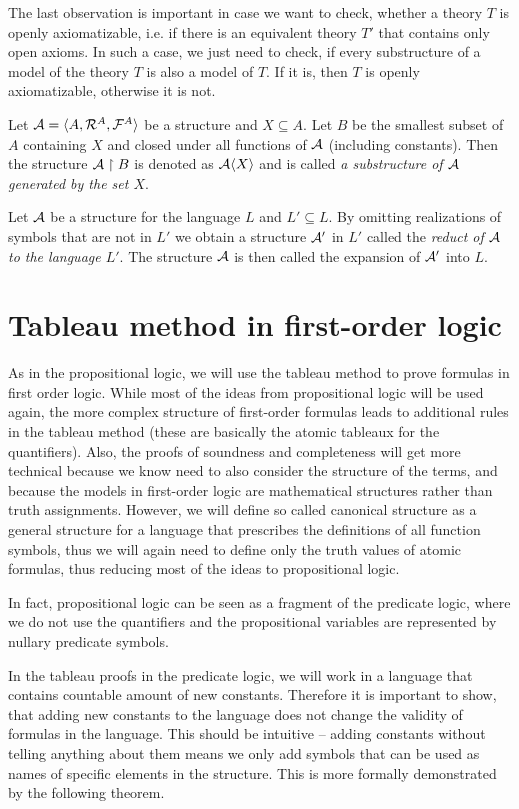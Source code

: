 The last observation is important in case we want to check, whether a theory $T$ is openly axiomatizable, i.e. if there is an equivalent theory $T'$ that contains only open axioms. In such a case, we just need to check, if every substructure of a model of the theory $T$ is also a model of $T$. If it is, then $T$ is openly axiomatizable, otherwise it is not.

Let $\mathcal{A} = \langle A, \mathcal{R}^A, \mathcal{F}^A \rangle$ be a structure and $X \subseteq A$. Let $B$ be the smallest subset of $A$ containing $X$ and closed under all functions of $\mathcal{A}$ (including constants). Then the structure $\mathcal{A} \upharpoonright B$ is denoted as $\mathcal{A}\langle X \rangle$ and is called \emph{a substructure of $\mathcal{A}$ generated by the set $X$}. 

Let $\mathcal{A}$ be a structure for the language $L$ and $L'\subseteq L$. By omitting realizations of symbols that are not in $L'$ we obtain a structure $\mathcal{A}'$ in $L'$ called the \emph{reduct of $\mathcal{A}$ to the language $L'$}. The structure $\mathcal{A}$ is then called the expansion of $\mathcal{A}'$ into $L$.

\chapter{Tableau method in first-order logic}

As in the propositional logic, we will use the tableau method to prove formulas in first order logic. While most of the ideas from propositional logic will be used again, the more complex structure of first-order formulas leads to additional rules in the tableau method (these are basically the atomic tableaux for the quantifiers). Also, the proofs of soundness and completeness will get more technical because we know need to also consider the structure of the terms, and because the models in first-order logic are mathematical structures rather than truth assignments. However, we will define so called canonical structure as a general structure for a language that prescribes the definitions of all function symbols, thus we will again need to define only the truth values of atomic formulas, thus reducing most of the ideas to propositional logic.

In fact, propositional logic can be seen as a fragment of the predicate logic, where we do not use the quantifiers and the propositional variables are represented by nullary predicate symbols.

In the tableau proofs in the predicate logic, we will work in a language that contains countable amount of new constants. Therefore it is important to show, that adding new constants to the language does not change the validity of formulas in the language. This should be intuitive -- adding constants without telling anything about them means we only add symbols that can be used as names of specific elements in the structure. This is more formally demonstrated by the following theorem.

